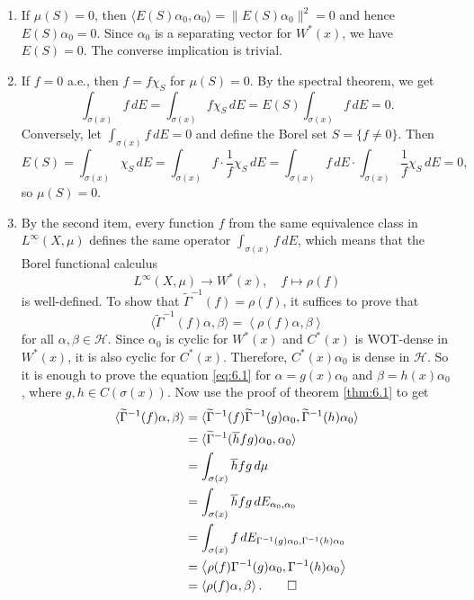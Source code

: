 \begin{myproof}
  \begin{enumerate}
    \item If $\mu (S) = 0$, then $\langle E(S) \alpha_0, \alpha_0 \rangle = \| E(S) \alpha_0 \|^2 = 0$ and hence $E(S) \alpha_0 = 0$.
    Since $\alpha_0$ is a separating vector for $W^* (x)$, we have $E(S) = 0$. The converse implication is trivial.
    \item If $f = 0$ a.e., then $f = f \chi_S$ for $\mu (S) = 0$. By the spectral theorem, we get $$\int_{\sigma(x)} f\, dE = \int_{\sigma(x)} f \chi_S\, dE = E(S) \int_{\sigma(x)} f\, dE = 0.$$
    Conversely, let $\int_{\sigma(x)} f\, dE = 0$ and define the Borel set $S = \{f \neq 0\}$. Then 
    $$E(S) = \int_{\sigma(x)} \chi_S\, dE = \int_{\sigma(x)}f \cdot \frac{1}{f} \chi_S\, dE = \int_{\sigma(x)} f\, dE \cdot \int_{\sigma(x)} \frac{1}{f} \chi_S\, dE = 0,$$
    so $\mu(S) = 0$.
    \item By the second item, every function $f$ from the same equivalence class in $L^\infty (X, \mu)$
    defines the same operator $\int_{\sigma(x)} f\, dE$, which means that the Borel functional calculus  
    $$L^\infty (X, \mu) \to W^* (x),\quad f \mapsto \rho (f)$$ is well-defined.
    To show that $\widetilde{\Gamma}^{-1} (f) = \rho (f)$, it suffices to prove that 
    \begin{equation}\label{eq:6.1}
      \langle \widetilde{\Gamma}^{-1} (f) \alpha, \beta \rangle = \left\langle \rho(f) \alpha, \beta \right\rangle
    \end{equation}
    for all $\alpha, \beta \in \mathcal{H}$.
    Since $\alpha_0$ is cyclic for $W^*(x)$ and $C^* (x)$ is WOT-dense in $W^* (x)$, it is also cyclic for $C^* (x)$.
    Therefore, $C^*(x) \alpha_0$ is dense in $\mathcal{H}$.  
    So it is enough to prove the equation \eqref{eq:6.1} for $\alpha = g(x) \alpha_0$ and $\beta = h(x) \alpha_0$,
    where $g, h \in C(\sigma(x))$. Now use the proof of theorem \ref{thm:6.1} to get
    \begin{align*}
      \langle \widetilde{\Gamma}^{-1} (f) \alpha, \beta \rangle &= \langle \widetilde{\Gamma}^{-1} (f) \widetilde{\Gamma}^{-1} (g) \alpha_0, \widetilde{\Gamma}^{-1} (h) \alpha_0\rangle\\
      &= \langle \widetilde{\Gamma}^{-1} (\overline{h} f g) \alpha_0, \alpha_0\rangle\\
      &= \int_{\sigma(x)} \overline{h} f g\, d\mu\\
      &= \int_{\sigma(x)} \overline{h} f g\, dE_{\alpha_0, \alpha_0}\\
      &= \int_{\sigma(x)} f\, dE_{\Gamma^{-1}(g) \alpha_0, \Gamma^{-1}(h) \alpha_0}\\
      &= \left\langle \rho(f) \Gamma^{-1}(g) \alpha_0, \Gamma^{-1}(h) \alpha_0 \right\rangle\\
      &= \left\langle \rho(f) \alpha, \beta \right\rangle. \qedhere
    \end{align*}
  \end{enumerate}
\end{myproof}

